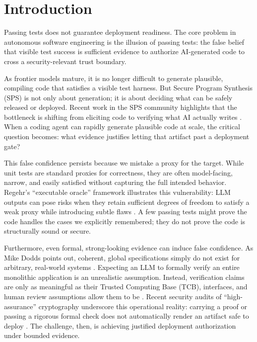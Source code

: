 \documentclass[11pt]{article}
\begin{document}
\vspace{0.25in}

\section{Introduction}

Passing tests does not guarantee deployment readiness. The core problem in autonomous software engineering is the illusion of passing tests: the false belief that visible test success is sufficient evidence to authorize AI-generated code to cross a security-relevant trust boundary.

As frontier models mature, it is no longer difficult to generate plausible, compiling code that satisfies a visible test harness. But Secure Program Synthesis (SPS) is not only about generation; it is about deciding what can be safely released or deployed. Recent work in the SPS community highlights that the bottleneck is shifting from eliciting code to verifying what AI actually writes \cite{VonHippel2026SPS, Dougherty2026SPSSequence}. When a coding agent can rapidly generate plausible code at scale, the critical question becomes: what evidence justifies letting that artifact past a deployment gate?

This false confidence persists because we mistake a proxy for the target. While unit tests are standard proxies for correctness, they are often model-facing, narrow, and easily satisfied without capturing the full intended behavior. Regehr's ``executable oracle'' framework illustrates this vulnerability: LLM outputs can pose risks when they retain sufficient degrees of freedom to satisfy a weak proxy while introducing subtle flaws \cite{Regehr2026ZeroDOF}. A few passing tests might prove the code handles the cases we explicitly remembered; they do not prove the code is structurally sound or secure.

Furthermore, even formal, strong-looking evidence can induce false confidence. As Mike Dodds points out, coherent, global specifications simply do not exist for arbitrary, real-world systems \cite{Dodds2025Specs}. Expecting an LLM to formally verify an entire monolithic application is an unrealistic assumption. Instead, verification claims are only as meaningful as their Trusted Computing Base (TCB), interfaces, and human review assumptions allow them to be \cite{OathTech2026LeanTCB}. Recent security audits of ``high-assurance'' cryptography underscore this operational reality: carrying a proof or passing a rigorous formal check does not automatically render an artifact safe to deploy \cite{Symbolic2026HighAssurance}. The challenge, then, is achieving justified deployment authorization under bounded evidence.
\end{document}
